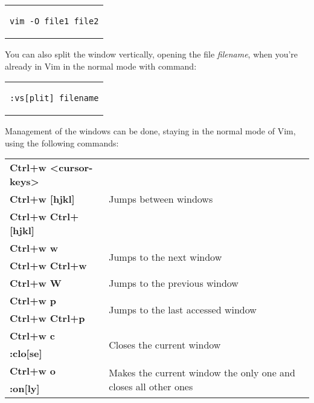 \begin{itemize}
{\begin{center}
\begin{tabular}{c}
\begin{lstlisting}[linewidth=100pt, basicstyle=\footnotesize\sffamily,]
vim -O file1 file2
\end{lstlisting}
\end{tabular}
\end{center}
You can also split the window vertically, opening the file \textit{filename}, when you're already in Vim in the normal mode with command:\\
\begin{center}
\begin{tabular}{c}
\begin{lstlisting}[linewidth=100pt, basicstyle=\footnotesize\sffamily,]
:vs[plit] filename
\end{lstlisting}
\end{tabular}
\end{center}
Management of the windows can be done, staying in the normal mode of Vim, using the following commands:\\
\begin{table}[h]
\centering
\footnotesize
\begin{tabular}{|l|l|}
\hline
\textbf{Ctrl+w  <cursor-keys>} & \multirow{3}{*}{Jumps between windows}\\
\cline{1-1}
\textbf{Ctrl+w  [hjkl]} & {}\\
\cline{1-1}
\textbf{Ctrl+w  Ctrl+[hjkl]} & {}\\
\hline
\textbf{Ctrl+w  w} & \multirow{2}{*}{Jumps to the next window}\\
\cline{1-1}
\textbf{Ctrl+w  Ctrl+w} & {}\\
\hline
\textbf{Ctrl+w  W} & {Jumps to the previous window}\\
\hline
\textbf{Ctrl+w  p} & \multirow{2}{*}{Jumps to the last accessed window}\\
\cline{1-1}
\textbf{Ctrl+w  Ctrl+p} & {}\\
\hline
\textbf{Ctrl+w  c} & \multirow{2}{*}{Closes the current window}\\
\cline{1-1}
\textbf{:clo[se]} & {}\\
\hline
\textbf{Ctrl+w  o} & \multirow{2}{*}{Makes the current window the only one and closes all other ones}\\
\cline{1-1}
\textbf{:on[ly]} & {}\\
\hline
\end{tabular}
\end{table}
}
\end{itemize}

